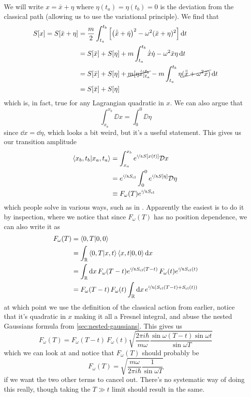 \documentclass[]{revision-notes}
\begin{document}
We will write \( x = \bar{x} + \eta \) where \(\eta(t_a) = \eta(t_b) = 0\) is the deviation from the classical path (allowing us to use the variational principle).
We find that
\begin{align*}
  S[x] = S[\bar{x} + \eta] &= \frac{m}{2}\int_{t_a}^{t_b} \qty[ \qty(\dot{\bar{x}} + \dot\eta)^2 - \omega^2(\bar{x} + \eta)^2] \dd{t}\\
                    &= S[\bar{x}] + S[\eta] + m\int_{t_a}^{t_b} \dot{\bar{x}}\dot\eta - \omega^2\bar{x}\eta\dd{t}\\
                    &= S[\bar{x}] + S[\eta] + \cancel{m[\eta \dot{\bar{x}}]_{t_a}^{t_b}} - m \int_{t_a}^{t_b}\eta \cancel{(\ddot{\bar{x}} + \omega^2 \bar{x}) }\dd{t}\\
                    &= S[\bar{x}] + S[\eta]
\end{align*}
which is, in fact, true for any Lagrangian quadratic in \(x\).
We can also argue that \[ \int_{x_a}^{x_b} \DD{x} = \int_{0}^{0} \DD{\eta}\] since \(\dd{x} = \dd{\eta} \), which looks a bit weird, but it's a useful statement.
This gives us our transition amplitude
\begin{align*}
  \braket{x_b, t_b}{x_a, t_a} &= \int_{x_a}^{x_b} e^{\nicefrac{i}{\hbar} S[x(t)]} \mathcal{D} x\,\\
  &= e^{\nicefrac{i}{\hbar} S_{\mathrm{cl}}} \int_{0}^{0} e^{\nicefrac{i}{\hbar} S[\eta]} \mathcal{D} \eta\,\\
  &\equiv F_\omega(T)e^{\nicefrac{i}{\hbar} S_{\mathrm{cl}}}
\end{align*}
which people solve in various ways, such as in \cite{feynman2010quantum}. Apparently the easiest is to do it by inspection, where we notice that since \( F_\omega (T) \) has no position dependence, we can also write it as
\begin{align*}
  F_\omega(T) &= \braket{0, T}{0, 0}\\
              &= \int_\mathbb{R} \bra{0,T}\ket{x,t}\bra{x,t}\ket{0,0} \dd{x}\\
              &= \int_\mathbb{R} \dd{x} F_\omega(T - t)e^{\nicefrac{i}{\hbar} S_{\mathrm{cl}}(T-t)}\,F_\omega(t)e^{\nicefrac{i}{\hbar} S_{\mathrm{cl}}(t)}\\
              &= F_\omega(T - t)\, F_\omega(t) \int_\mathbb{R} \dd{x} e^{\nicefrac{i}{\hbar} (S_{\mathrm{cl}}(T-t) + S_{\mathrm{cl}}(t))}
\end{align*}
at which point we use the definition of the classical action from earlier, notice that it's quadratic in \(x \) making it all a Fresnel integral, and abuse the nested Gaussians formula from \autoref{sec:nested-gaussians}.
This gives us
\begin{equation*}
  F_\omega(T) = F_\omega(T - t)\, F_\omega(t) \sqrt{\frac{2\pi i \hbar}{m\omega} \frac{\sin\omega(T-t) \sin\omega t}{\sin \omega T}}
\end{equation*}
which we can look at and notice that \( F_\omega (T) \) should probably be
\[ F_\omega (T) = \sqrt{\frac{m\omega}{2\pi i \hbar} \frac{1}{\sin \omega T}} \] if we want the two other terms to cancel out. There's no systematic way of doing this really, though taking the \( T \gg t \) limit should result in the same.
\end{document}

